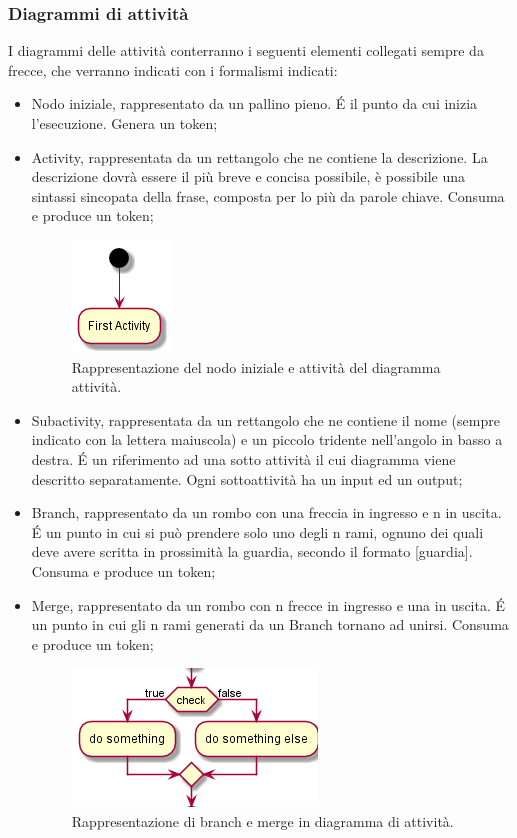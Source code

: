\documentclass[NormeDiProgetto.tex]{subfiles}
\begin{document}
\subsubsection{Diagrammi di attività}
I diagrammi delle attività conterranno i seguenti elementi collegati sempre da frecce, che verranno indicati con i formalismi indicati:
\begin{itemize}
\item  Nodo iniziale, rappresentato da un pallino pieno. \'E il punto da cui inizia l'esecuzione. Genera un token;
\item  Activity, rappresentata da un rettangolo che ne contiene la descrizione. La descrizione dovrà essere il più breve e concisa possibile, è possibile una sintassi sincopata della frase, composta per lo più da parole chiave. Consuma e produce un token;
\begin{figure}[h]
	\centering
	\includegraphics[width=0.2\linewidth]{progettazione/activity}
	\caption{Rappresentazione del nodo iniziale e attività del diagramma attività.}
	\label{fig:activity}
\end{figure}

\item Subactivity, rappresentata da un rettangolo che ne contiene il nome (sempre indicato con la lettera maiuscola) e un piccolo tridente nell'angolo in basso a destra. \'E un riferimento ad una sotto attività il cui diagramma viene descritto separatamente. Ogni sottoattività ha un input ed un output;

\item Branch, rappresentato da un rombo con una freccia in ingresso e n in uscita. \'E
un punto in cui si può prendere solo uno degli n rami, ognuno dei quali deve avere
scritta in prossimità la guardia, secondo il formato [guardia]. Consuma e produce
un token;
\item Merge, rappresentato da un rombo con n frecce in ingresso e una in uscita. \'E
un punto in cui gli n rami generati da un Branch tornano ad unirsi. Consuma e produce un token;
\begin{figure}[h]
	\centering
	\includegraphics[width=0.4\linewidth]{progettazione/activitybranch}
	\caption{Rappresentazione di branch e merge in diagramma di attività.}
	\label{fig:activitybranch}
\end{figure}


\end{itemize}
\end{document}

